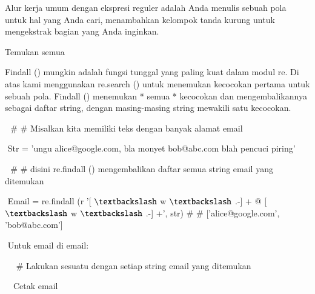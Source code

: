 \documentclass[a4paper,12pt]{report}
\begin{document}
\noindent 
Alur kerja umum dengan ekspresi reguler adalah Anda menulis sebuah pola untuk hal yang Anda cari, menambahkan kelompok tanda kurung untuk mengekstrak bagian yang Anda inginkan. \par
\noindent 
Temukan semua \par
\noindent 
Findall () mungkin adalah fungsi tunggal yang paling kuat dalam modul re. Di atas kami menggunakan re.search () untuk menemukan kecocokan pertama untuk sebuah pola. Findall () menemukan * semua * kecocokan dan mengembalikannya sebagai daftar string, dengan masing-masing string mewakili satu kecocokan. \par
\noindent 
\vspace{10pt}
\noindent 
{\fontsize{10pt}{10pt}\selectfont  $  $ $  $ $  \#  $ $  \#  $ Misalkan kita memiliki teks dengan banyak alamat email} \par
\noindent 
{\fontsize{10pt}{10pt}\selectfont  $  $ $  $Str = 'ungu alice@google.com, bla monyet bob@abc.com blah pencuci piring'} \par
\noindent 
\vspace{10pt}
\noindent 
{\fontsize{10pt}{10pt}\selectfont  $  $ $  $ $  \#  $ $  \#  $ disini re.findall () mengembalikan daftar semua string email yang ditemukan} \par
\noindent 
{\fontsize{10pt}{10pt}\selectfont  $  $ $  $Email = re.findall (r '[ $  \textbackslash  $ w  $  \textbackslash  $ .-] + @ [ $  \textbackslash  $ w  $  \textbackslash  $ .-] +', str)  $  \#  $ $  \#  $ ['alice@google.com', 'bob@abc.com']} \par
\noindent 
{\fontsize{10pt}{10pt}\selectfont  $  $ $  $Untuk email di email:} \par
\noindent 
{\fontsize{10pt}{10pt}\selectfont  $  $ $  $ $  $ $  $ $  \#  $ Lakukan sesuatu dengan setiap string email yang ditemukan} \par
\noindent 
{\fontsize{10pt}{10pt}\selectfont  $  $ $  $ $  $ $  $Cetak email} \par
\noindent 
\vspace{16pt}
\end{document}
